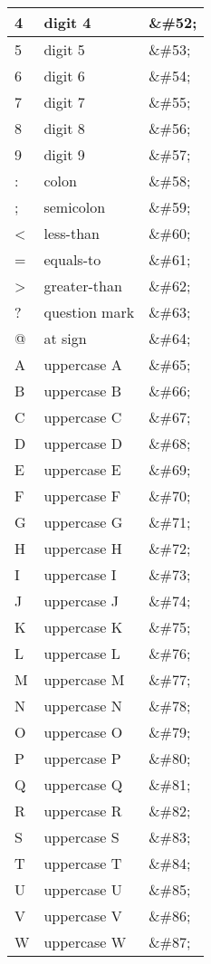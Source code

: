 \begin{longtable}{|l|l|l|}
4	&digit 4				&\&\#52;\\
\hline
5	&digit 5				&\&\#53;\\
\hline
6	&digit 6				&\&\#54;\\
\hline
7	&digit 7				&\&\#55;\\
\hline
8	&digit 8				&\&\#56;\\
\hline
9	&digit 9				&\&\#57;\\
\hline
:	&colon				&\&\#58;\\
\hline
;	&semicolon			&\&\#59;\\
\hline
<	&less-than			&\&\#60;\\
\hline
=	&equals-to			&\&\#61;\\
\hline
>	&greater-than			&\&\#62;\\
\hline
?	&question mark		&\&\#63;\\
\hline
@	&at sign				&\&\#64;\\
\hline
A	&uppercase A			&\&\#65;\\
\hline
B	&uppercase B			&\&\#66;\\
\hline
C	&uppercase C			&\&\#67;\\
\hline
D	&uppercase D			&\&\#68;\\
\hline
E	&uppercase E			&\&\#69;\\
\hline
F	&uppercase F			&\&\#70;\\
\hline
G	&uppercase G			&\&\#71;\\
\hline
H	&uppercase H			&\&\#72;\\
\hline
I	&uppercase I			&\&\#73;\\
\hline
J	&uppercase J			&\&\#74;\\
\hline
K	&uppercase K			&\&\#75;\\
\hline
L	&uppercase L			&\&\#76;\\
\hline
M	&uppercase M			&\&\#77;\\
\hline
N	&uppercase N			&\&\#78;\\
\hline
O	&uppercase O			&\&\#79;\\
\hline
P	&uppercase P			&\&\#80;\\
\hline
Q	&uppercase Q			&\&\#81;\\
\hline
R	&uppercase R			&\&\#82;\\
\hline
S	&uppercase S			&\&\#83;\\
\hline
T	&uppercase T			&\&\#84;\\
\hline
U	&uppercase U			&\&\#85;\\
\hline
V	&uppercase V			&\&\#86;\\
\hline
W	&uppercase W		&\&\#87;\\

\end{longtable}

